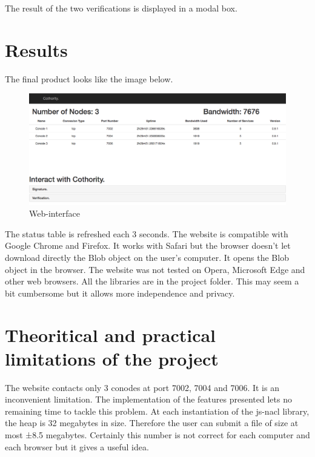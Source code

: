 \documentclass[11pt, a4paper, twoside, openright, openany]{article} %
\begin{document}
The result of the two verifications is displayed in a modal box.
\bigbreak

\section{Results}
The final product looks like the image below.
\bigbreak

\begin{figure}[ht!]
\centering
\includegraphics[width=125mm]{interface.jpg}
\caption{Web-interface}
\end{figure}
\leavevmode \newline

The status table is refreshed each 3 seconds.
\newline
The website is compatible with Google Chrome and Firefox. It works with Safari
but the browser doesn't let download directly the Blob object on the user's computer. It
opens the Blob object in the browser. The website was not tested on Opera, Microsoft Edge and other web browsers.
\newline
All the libraries are in the project folder. This may seem a bit cumbersome but
it allows more independence and privacy.
\newline

\section{Theoritical and practical limitations of the project}
The website contacts only 3 conodes at port 7002, 7004 and 7006. It is an inconvenient
limitation. The implementation of the features presented lets no remaining time to tackle
this problem.
\newline
At each instantiation of the js-nacl library, the heap is 32 megabytes in size. Therefore
the user can submit a file of size at most ±8.5 megabytes. Certainly this number is
not correct for each computer and each browser but it gives a useful idea.
\newline
\end{document}
